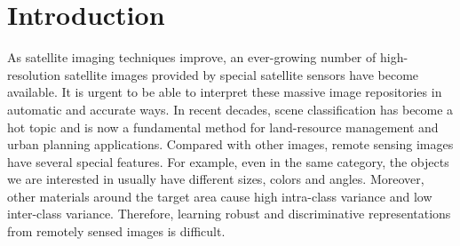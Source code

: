 \documentclass[journal]{IEEEtran}
\begin{document}
\section{Introduction}
\label{introduction}
As satellite imaging techniques improve, an ever-growing number of high-resolution satellite images provided by special satellite sensors have become available. It is urgent to be able to interpret these massive image repositories in automatic and accurate ways. In recent decades, scene classification has become a hot topic and is now a fundamental method for land-resource management and urban planning applications. Compared with other images, remote sensing images have several special features. For example, even in the same category, the objects we are interested in usually have different sizes, colors and angles. Moreover, other materials around the target area cause high intra-class variance and low inter-class variance. Therefore, learning robust and discriminative representations from remotely sensed images is difficult.
\end{document}
